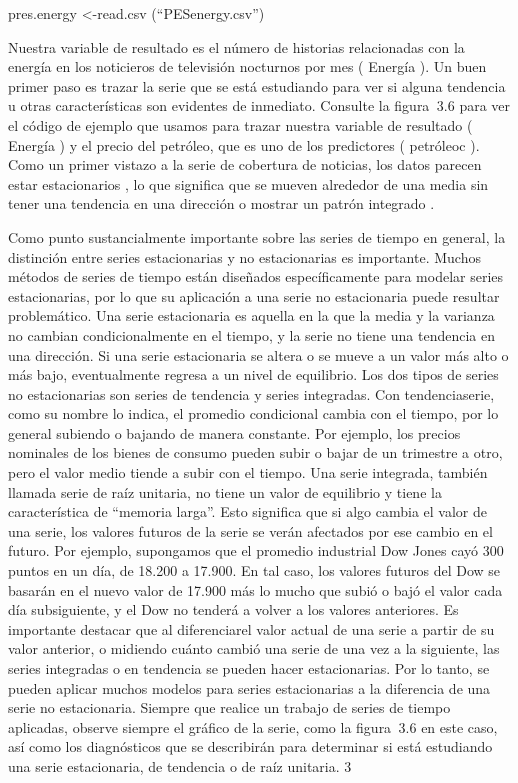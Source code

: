 \documentclass[
]{book}
\begin{document}
pres.energy \textless-read.csv (``PESenergy.csv'')

Nuestra variable de resultado es el número de historias relacionadas con la energía en los noticieros de televisión nocturnos por mes ( Energía ). Un buen primer paso es trazar la serie que se está estudiando para ver si alguna tendencia u otras características son evidentes de inmediato. Consulte la figura  3.6 para ver el código de ejemplo que usamos para trazar nuestra variable de resultado ( Energía ) y el precio del petróleo, que es uno de los predictores ( petróleoc ). Como un primer vistazo a la serie de cobertura de noticias, los datos parecen estar estacionarios , lo que significa que se mueven alrededor de una media sin tener una tendencia en una dirección o mostrar un patrón integrado .

Como punto sustancialmente importante sobre las series de tiempo en general, la distinción entre series estacionarias y no estacionarias es importante. Muchos métodos de series de tiempo están diseñados específicamente para modelar series estacionarias, por lo que su aplicación a una serie no estacionaria puede resultar problemático. Una serie estacionaria es aquella en la que la media y la varianza no cambian condicionalmente en el tiempo, y la serie no tiene una tendencia en una dirección. Si una serie estacionaria se altera o se mueve a un valor más alto o más bajo, eventualmente regresa a un nivel de equilibrio. Los dos tipos de series no estacionarias son series de tendencia y series integradas. Con tendenciaserie, como su nombre lo indica, el promedio condicional cambia con el tiempo, por lo general subiendo o bajando de manera constante. Por ejemplo, los precios nominales de los bienes de consumo pueden subir o bajar de un trimestre a otro, pero el valor medio tiende a subir con el tiempo. Una serie integrada, también llamada serie de raíz unitaria, no tiene un valor de equilibrio y tiene la característica de ``memoria larga''. Esto significa que si algo cambia el valor de una serie, los valores futuros de la serie se verán afectados por ese cambio en el futuro. Por ejemplo, supongamos que el promedio industrial Dow Jones cayó 300 puntos en un día, de 18.200 a 17.900. En tal caso, los valores futuros del Dow se basarán en el nuevo valor de 17.900 más lo mucho que subió o bajó el valor cada día subsiguiente, y el Dow no tenderá a volver a los valores anteriores. Es importante destacar que al diferenciarel valor actual de una serie a partir de su valor anterior, o midiendo cuánto cambió una serie de una vez a la siguiente, las series integradas o en tendencia se pueden hacer estacionarias. Por lo tanto, se pueden aplicar muchos modelos para series estacionarias a la diferencia de una serie no estacionaria. Siempre que realice un trabajo de series de tiempo aplicadas, observe siempre el gráfico de la serie, como la figura  3.6 en este caso, así como los diagnósticos que se describirán para determinar si está estudiando una serie estacionaria, de tendencia o de raíz unitaria. 3
\end{document}
